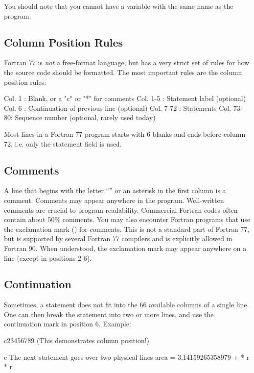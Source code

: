 You should note that you cannot have a variable with the same name as
the program.


\subsection*{Column Position Rules}

Fortran 77 is \textit{not} a free-format language, but has a very strict
set of rules for how the source code should be formatted. The most
important rules are the column position rules:

\begin{xminicode}
Col. 1    : Blank, or a "c" or "*" for comments
Col. 1-5  : Statement label (optional)
Col. 6    : Continuation of previous line (optional)
Col. 7-72 : Statements
Col. 73-80: Sequence number (optional, rarely used today)
\end{xminicode}

Most lines in a Fortran 77 program starts with 6 blanks and ends before
column 72, i.e. only the statement field is used.


\subsection*{Comments}

A line that begins with the letter ``'' or an
asterisk in the first column is a comment. Comments may appear anywhere
in the program. Well-written comments are crucial to program
readability. Commercial Fortran codes often contain about 50\% comments.
You may also encounter Fortran programs that use the exclamation mark
(\inlinefortranss{!}) for comments. This is not a standard part of
Fortran 77, but is supported by several Fortran 77 compilers and is
explicitly allowed in Fortran 90. When understood, the exclamation mark
may appear anywhere on a line (except in positions 2-6).


\subsection*{Continuation}

Sometimes, a statement does not fit into the 66 available columns of a
single line. One can then break the statement into two or more lines,
and use the continuation mark in position 6. Example:

\ifmini{\pagebreak}{}

\begin{fortran77}
c23456789 (This demonstrates column position!)

c The next statement goes over two physical lines
      area = 3.14159265358979
     +       * r * r
\end{fortran77}


